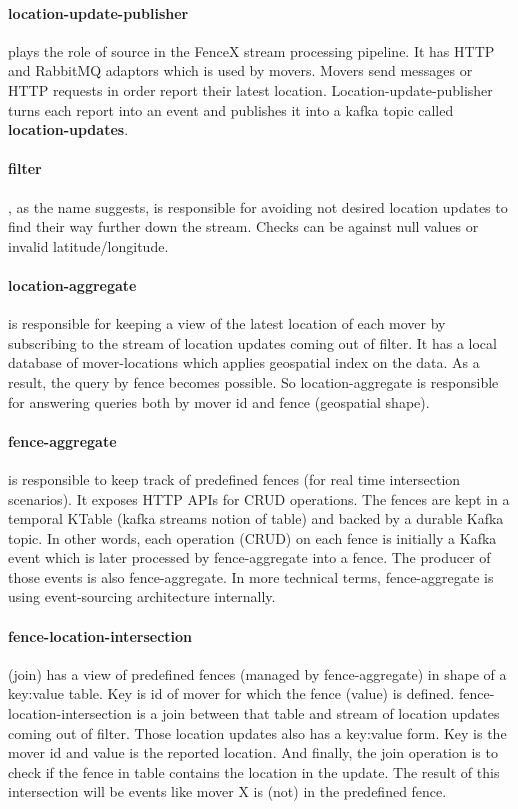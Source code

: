 \documentclass[a4]{report}
\begin{document}
    \paragraph{location-update-publisher} plays the role of source in the FenceX stream processing pipeline.
    It has HTTP and RabbitMQ adaptors which is used by movers.
    Movers send messages or HTTP requests in order report their latest location.
    Location-update-publisher turns each report into an event and publishes it into a kafka topic called
    \textbf{location-updates}.

    \paragraph{filter}, as the name suggests, is responsible for avoiding not desired location updates to find their
    way further down the stream.
    Checks can be against null values or invalid latitude/longitude.

    \paragraph{location-aggregate} is responsible for keeping a view of the latest location of each mover by
    subscribing to the stream of location updates coming out of filter.
    It has a local database of mover-locations which applies geospatial index on the data.
    As a result, the query by fence becomes possible.
    So location-aggregate is responsible for answering queries both by mover id and fence (geospatial shape).

    \paragraph{fence-aggregate} is responsible to keep track of predefined fences (for real time intersection scenarios).
    It exposes HTTP APIs for CRUD operations.
    The fences are kept in a temporal KTable (kafka streams notion of table) and backed by a durable Kafka topic.
    In other words, each operation (CRUD) on each fence is initially a Kafka event which is later processed by
    fence-aggregate into a fence.
    The producer of those events is also fence-aggregate.
    In more technical terms, fence-aggregate is using event-sourcing architecture internally.

    \paragraph{fence-location-intersection} (join) has a view of predefined fences (managed by fence-aggregate) in
    shape of a key:value table.
    Key is id of mover for which the fence (value) is defined.
    fence-location-intersection is a join between that table and stream of location updates coming out of filter.
    Those location updates also has a key:value form.
    Key is the mover id and value is the reported location.
    And finally, the join operation is to check if the fence in table contains the location in the update.
    The result of this intersection will be events like mover X is (not) in the predefined fence.
\end{document}
